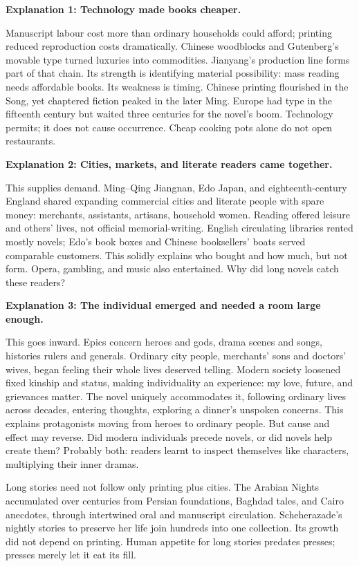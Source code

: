 \textbf{Explanation 1: Technology made books cheaper.}

Manuscript labour cost more than ordinary households could afford; printing reduced reproduction costs dramatically. Chinese woodblocks and Gutenberg's movable type turned luxuries into commodities. Jianyang's production line forms part of that chain. Its strength is identifying material possibility: mass reading needs affordable books. Its weakness is timing. Chinese printing flourished in the Song, yet chaptered fiction peaked in the later Ming. Europe had type in the fifteenth century but waited three centuries for the novel's boom. Technology permits; it does not cause occurrence. Cheap cooking pots alone do not open restaurants.

\textbf{Explanation 2: Cities, markets, and literate readers came together.}

This supplies demand. Ming--Qing Jiangnan, Edo Japan, and eighteenth-century England shared expanding commercial cities and literate people with spare money: merchants, assistants, artisans, household women. Reading offered leisure and others' lives, not official memorial-writing. English circulating libraries rented mostly novels; Edo's book boxes and Chinese booksellers' boats served comparable customers. This solidly explains who bought and how much, but not form. Opera, gambling, and music also entertained. Why did long novels catch these readers?

\textbf{Explanation 3: The individual emerged and needed a room large enough.}

This goes inward. Epics concern heroes and gods, drama scenes and songs, histories rulers and generals. Ordinary city people, merchants' sons and doctors' wives, began feeling their whole lives deserved telling. Modern society loosened fixed kinship and status, making individuality an experience: my love, future, and grievances matter. The novel uniquely accommodates it, following ordinary lives across decades, entering thoughts, exploring a dinner's unspoken concerns. This explains protagonists moving from heroes to ordinary people. But cause and effect may reverse. Did modern individuals precede novels, or did novels help create them? Probably both: readers learnt to inspect themselves like characters, multiplying their inner dramas.

Long stories need not follow only printing plus cities. The Arabian Nights accumulated over centuries from Persian foundations, Baghdad tales, and Cairo anecdotes, through intertwined oral and manuscript circulation. Scheherazade's nightly stories to preserve her life join hundreds into one collection. Its growth did not depend on printing. Human appetite for long stories predates presses; presses merely let it eat its fill.

